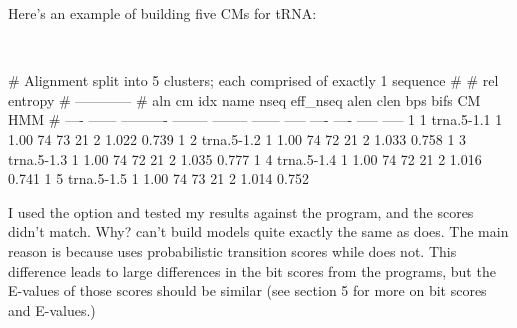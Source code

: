 Here's an example of building five  CMs for tRNA:

{\samepage
{}\\

\begin{sreoutput}
# Alignment split into 5 clusters; each comprised of exactly 1 sequence
#
#                                                                           rel entropy
#                                                                          ------------
#  aln  cm idx  name            nseq  eff_nseq    alen   clen   bps  bifs     CM    HMM
# ----  ------  ----------  --------  --------  ------  -----  ----  ----  -----  -----
     1       1  trna.5-1.1         1      1.00      74     73    21     2  1.022  0.739
     1       2  trna.5-1.2         1      1.00      74     72    21     2  1.033  0.758
     1       3  trna.5-1.3         1      1.00      74     72    21     2  1.035  0.777
     1       4  trna.5-1.4         1      1.00      74     72    21     2  1.016  0.741
     1       5  trna.5-1.5         1      1.00      74     73    21     2  1.014  0.752
\end{sreoutput}
}

\begin{srefaq}{I used the  option and tested my
results against the  program, and the scores didn't
match. Why?}  can't build models quite exactly the
same as  does. The main reason is because
 uses probabilistic transition scores while
 does not. This difference leads to large
differences in the bit scores from the programs, but the E-values of
those scores should be similar (see section 5 for more on bit scores
and E-values.)
\end{srefaq}

